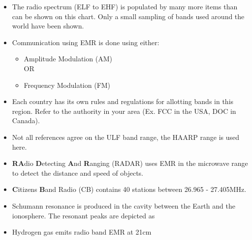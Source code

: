 \begin{itemize}

\item The radio spectrum (ELF to EHF) is populated by many more items than can be shown on this chart. Only a small sampling of bands used around the world have been shown.

\item Communication using EMR is done using either:
\begin{itemize}
\item Amplitude Modulation (AM)
\vspace{0.1in}\\
\vspace{0.04in}OR
\item Frequency Modulation (FM)
\vspace{0.1in}
\end{itemize}

\item Each country has its own rules and regulations for allotting bands in this region. Refer to the authority in your area (Ex. FCC in the USA, DOC in Canada).

\item Not all references agree on the ULF band range, the HAARP range is used here.

\item {\bfseries RA}dio {\bfseries D}etecting {\bfseries A}nd {\bfseries R}anging (RADAR) uses EMR in the microwave range to detect the distance and speed of objects.

\item {\bfseries C}itizens {\bfseries B}and Radio (CB) contains 40 stations between 26.965 - 27.405MHz.

\item Schumann resonance is produced in the cavity between the Earth and the ionosphere. The resonant peaks are depicted as 

\item Hydrogen gas emits radio band EMR at 21cm 


\end{itemize}

